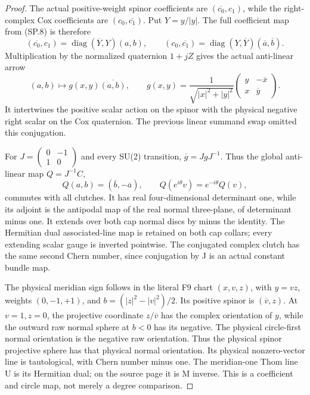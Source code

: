 \begin{proof}
The actual positive-weight spinor coefficients are
\((\overline{c_0},c_1)\), while the right-complex Cox coefficients are
\((c_0,\overline{c_1})\). Put \(Y=y/|y|\). The full coefficient map
from (SP.8) is therefore
\[
 (\overline{c_0},c_1)=\operatorname{diag}(\overline Y,Y)(a,b),
 \qquad (c_0,\overline{c_1})
      =\operatorname{diag}(Y,\overline Y)(\overline a,\overline b).
\]
Multiplication by the normalized quaternion \(1+jZ\) gives the actual
anti-linear arrow
\[
 (a,b)\longmapsto g(x,y)\overline{(a,b)},\qquad
 g(x,y)=\frac1{\sqrt{|x|^2+|y|^2}}
 \begin{pmatrix}y&-\overline x\\x&\overline y\end{pmatrix}.
                                                        \tag{SP.9}
\]
It intertwines the positive scalar action on the spinor with the
physical negative right scalar on the Cox quaternion. The previous
linear summand swap omitted this conjugation.

For \(J=\left(\begin{smallmatrix}0&-1\\1&0\end{smallmatrix}\right)\)
and every SU(2) transition, \(\overline g=JgJ^{-1}\). Thus the
global anti-linear map \(Q=J^{-1}C\),
\[
 Q(a,b)=(\overline b,-\overline a),\qquad
 Q(e^{i\theta}v)=e^{-i\theta}Q(v),                       \tag{SP.10}
\]
commutes with all clutches. It has real four-dimensional determinant
one, while its adjoint is the antipodal map of the real normal
three-plane, of determinant minus one. It extends over both cap
normal discs by minus the identity. The Hermitian dual associated-line
map is retained on both cap collars; every extending scalar gauge is
inverted pointwise. The conjugated complex clutch has the same second
Chern number, since conjugation by J is an actual constant bundle map.

The physical meridian sign follows in the literal F9 chart
\((x,v,z)\), with \(y=vz\), weights \((0,-1,+1)\), and
\(b=(|z|^2-|v|^2)/2\). Its positive spinor is
\((\overline v,z)\). At \(v=1,z=0\), the projective coordinate
\(z/\overline v\) has the complex orientation of \(y\), while
the outward raw normal sphere at \(b<0\) has its negative. The
physical circle-first normal orientation is the negative raw
orientation. Thus the physical spinor projective sphere has that
physical normal orientation. Its physical nonzero-vector line is
tautological, with Chern number minus one. The meridian-one Thom
line U is its Hermitian dual; on the source page it is M inverse.
This is a coefficient and circle map, not merely a degree comparison.


\end{proof}

